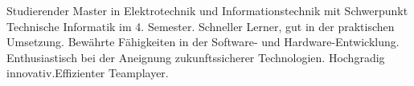 

\begin{cvparagraph}

Studierender Master in Elektrotechnik und Informationstechnik mit Schwerpunkt Technische Informatik im 4. Semester. Schneller Lerner, gut in der praktischen Umsetzung. Bewährte Fähigkeiten in der Software- und Hardware-Entwicklung. Enthusiastisch bei der Aneignung zukunftssicherer Technologien. Hochgradig innovativ.Effizienter Teamplayer.
\end{cvparagraph}
